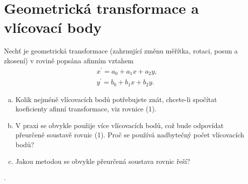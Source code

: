\section{Geometrická transformace a vlícovací body}
Nechť je geometrická transformace (zahrnující změnu měřítka, rotaci, posun a zkosení) v rovině popsána afinním vztahem
\begin{align}
    x^{\prime}=a_{0}+a_{1}x+a_{2}y, \\
    y^{\prime}=b_{0}+b_{1}x+b_{2}y.
\end{align}
\begin{enumerate}[a)]
    \item Kolik nejméně vlícovacích bodů potřebujete znát, chcete-li spočítat koeficienty afinní transformace, viz 
    rovnice (1).
    \item V praxi se obvykle použije více vlícovacích bodů, což bude odpovídat přeurčené soustavě rovnic (1). Proč se 
    používá nadbytečný počet vlícovacích bodů?
    \item Jakou metodou se obvykle přeurčená soustava rovnic řeší?
\end{enumerate}.
